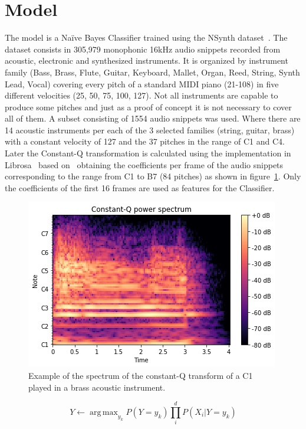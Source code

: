 \documentclass{article}
\DeclareMathOperator*{\argmaxA}{arg\,max}
\begin{document}
\section{Model}\label{sec:proposedmodel}
The model is a Na\"{i}ve Bayes Classifier trained using the NSynth dataset~\cite{engel_neural_2017}. The dataset consists in 305,979 monophonic 16kHz audio snippets recorded from acoustic, electronic and synthesized instruments. It is organized by instrument family (Bass, Brass, Flute, Guitar, Keyboard, Mallet, Organ, Reed, String, Synth Lead, Vocal) covering every pitch of a standard MIDI piano (21-108) in five different velocities (25, 50, 75, 100, 127).
Not all instruments are capable to produce some pitches and just as a proof of concept it is not necessary to cover all of them. A subset consisting of 1554 audio snippets was used. Where there are 14 acoustic instruments per each of the 3 selected families (string, guitar, brass) with a constant velocity of 127 and the 37 pitches in the range of C1 and C4. Later the Constant-Q transformation is calculated using the implementation in Librosa~\cite{brian_mcfee-proc-scipy-2015} based on~\cite{schoerkhuber_constant-q_2010} obtaining the coefficients per frame of the audio snippets corresponding to the range from C1 to B7 (84 pitches) as shown in figure~\ref{ExampleConstantQ}. Only the coefficients of the first 16 frames are used as features for the Classifier.
\begin{figure}[h!]
	\begin{center}
	\includegraphics[scale=0.5]{ExampleConstantQ}
	\caption{Example of the spectrum of the constant-Q transform of a C1 played in a brass acoustic instrument.}
	\label{ExampleConstantQ}
	\end{center}
\end{figure}
\begin{equation}\label{eq_1}
Y \leftarrow \argmaxA_{y_k} P(Y = y_k)\prod_{i}^{d}{P(X_i|Y = y_k)}
\end{equation}
\end{document}
